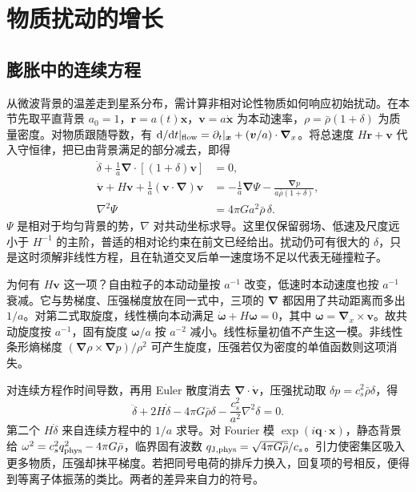 \section{物质扰动的增长}\label{sec:cosmo-growth}

\subsection{膨胀中的连续方程}

从微波背景的温差走到星系分布，需计算非相对论性物质如何响应初始扰动。在本节先取平直背景 $a_0=1$，$\bm r=a(t)\bm x$，$\bm v=a\dot{\bm x}$ 为本动速率，$\rho=\bar\rho(1+\delta)$ 为质量密度。对物质跟随导数，有 $\dd/\dd t|_{\rm flow}=\partial_t|_{\bm x}+(\bm v/a)\cdot\bm\nabla_x$。将总速度 $H\bm r+\bm v$ 代入守恒律，把已由背景满足的部分减去，即得
\begin{align}
 \dot\delta+\frac1a\bm\nabla\cdot[(1+\delta)\bm v]&=0,\label{eq:cosmo-newt-fluid}\\
 \dot{\bm v}+H\bm v+\frac1a(\bm v\cdot\bm\nabla)\bm v
   &=-\frac1a\bm\nabla\Psi-\frac{\bm\nabla p}{a\bar\rho(1+\delta)},\nonumber\\
 \nabla^2\Psi&=4\pi Ga^2\bar\rho\,\delta.\nonumber
\end{align}
$\Psi$ 是相对于均匀背景的势，$\nabla$ 对共动坐标求导。这里仅保留弱场、低速及尺度远小于 $H^{-1}$ 的主阶，普适的相对论约束在前文已经给出。扰动仍可有很大的 $\delta$，只是这时须解非线性方程，且在轨道交叉后单一速度场不足以代表无碰撞粒子。

为何有 $H\bm v$ 这一项？自由粒子的本动动量按 $a^{-1}$ 改变，低速时本动速度也按 $a^{-1}$ 衰减。它与势梯度、压强梯度放在同一式中，三项的 $\bm\nabla$ 都因用了共动距离而多出 $1/a$。对第二式取旋度，线性横向本动满足 $\dot{\bm\omega}+H\bm\omega=0$，其中 $\bm\omega=\bm\nabla_x\times\bm v$。故共动旋度按 $a^{-1}$，固有旋度 $\bm\omega/a$ 按 $a^{-2}$ 减小。线性标量初值不产生这一模。非线性条形熵梯度 $(\bm\nabla\rho\times\bm\nabla p)/\rho^2$ 可产生旋度，压强若仅为密度的单值函数则这项消失。

对连续方程作时间导数，再用 Euler 散度消去 $\bm\nabla\cdot\dot{\bm v}$，压强扰动取 $\delta p=c_s^2\bar\rho\delta$，得
\begin{equation}\label{eq:cosmo-linear-growth}
 \ddot\delta+2H\dot\delta-4\pi G\bar\rho\delta-\frac{c_s^2}{a^2}\nabla^2\delta=0 .
\end{equation}
第二个 $H\dot\delta$ 来自连续方程中的 $1/a$ 求导。对 Fourier 模 $\exp(i\bm q\cdot\bm x)$，静态背景给 $\omega^2=c_s^2q_{\rm phys}^2-4\pi G\bar\rho$，临界固有波数 $q_{\rm J,phys}=\sqrt{4\pi G\bar\rho}/c_s$。引力使密集区吸入更多物质，压强却抹平梯度。若把同号电荷的排斥力换入，回复项的号相反，便得到等离子体振荡的类比。两者的差异来自力的符号。

